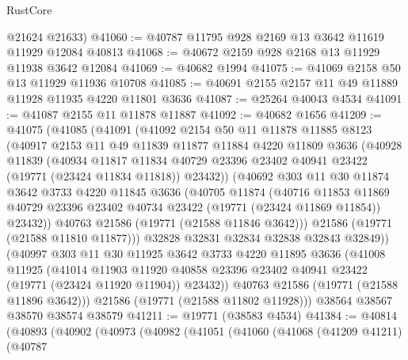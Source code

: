 \begin{lexlean}{RustCore}
\begin{coremodule}
      @21624
      @21633)
@41060 := @40787 @11795 @928 @2169 @13 @3642 @11619 @11929 @12084 @40813
@41068 := @40672 @2159 @928 @2168 @13 @11929 @11938 @3642 @12084
@41069 := @40682 @1994
@41075 := @41069 @2158 @50 @13 @11929 @11936 @10708
@41085 := @40691 @2155 @2157 @11 @49 @11889 @11928 @11935 @4220 @11801 @3636
@41087 := @25264 @40043 @4534
@41091 := @41087 @2155 @11 @11878 @11887
@41092 := @40682 @1656
@41209 := @41075
    (@41085
      (@41091
        (@41092
          @2154
          @50
          @11
          @11878
          @11885
          @8123
          (@40917
            @2153
            @11
            @49
            @11839
            @11877
            @11884
            @4220
            @11809
            @3636
            (@40928
              @11839
              (@40934
                @11817
                @11834
                @40729
                @23396
                @23402
                @40941
                @23422
                (@19771 (@23424 @11834 @11818))
                @23432))
            (@40692
              @303
              @11
              @30
              @11874
              @3642
              @3733
              @4220
              @11845
              @3636
              (@40705
                @11874
                (@40716
                  @11853
                  @11869
                  @40729
                  @23396
                  @23402
                  @40734
                  @23422
                  (@19771 (@23424 @11869 @11854))
                  @23432))
              @40763
              @21586
              (@19771 (@21588 @11846 @3642)))
            @21586
            (@19771 (@21588 @11810 @11877)))
          @32828
          @32831
          @32834
          @32838
          @32843
          @32849))
      (@40997
        @303
        @11
        @30
        @11925
        @3642
        @3733
        @4220
        @11895
        @3636
        (@41008
          @11925
          (@41014
            @11903
            @11920
            @40858
            @23396
            @23402
            @40941
            @23422
            (@19771 (@23424 @11920 @11904))
            @23432))
        @40763
        @21586
        (@19771 (@21588 @11896 @3642)))
      @21586
      (@19771 (@21588 @11802 @11928)))
    @38564
    @38567
    @38570
    @38574
    @38579
@41211 := @19771 (@38583 @4534)
@41384 := @40814
    (@40893
      (@40902
        (@40973
          (@40982
            (@41051
              (@41060
                (@41068
                  (@41209 @41211)
                  (@40787

\end{coremodule}
\end{lexlean}
